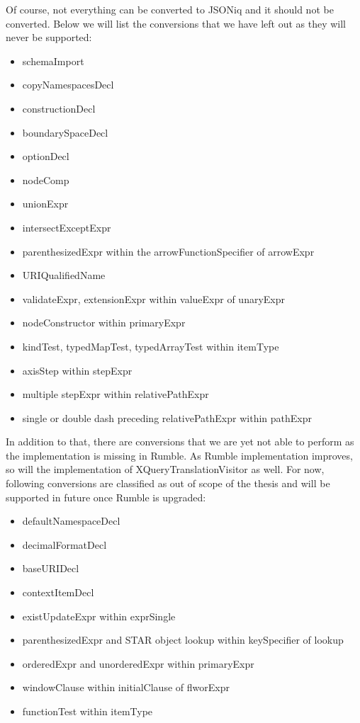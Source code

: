 Of course, not everything can be converted to JSONiq and it should not be converted. Below we will list the conversions that we have left out as they will never be supported:
\begin{itemize}
	\item schemaImport
	\item copyNamespacesDecl
	\item constructionDecl
	\item boundarySpaceDecl
	\item optionDecl
	\item nodeComp
	\item unionExpr
	\item intersectExceptExpr
	\item parenthesizedExpr within the arrowFunctionSpecifier of arrowExpr
	\item URIQualifiedName
	\item validateExpr, extensionExpr within valueExpr of unaryExpr
	\item nodeConstructor within primaryExpr
	\item kindTest, typedMapTest, typedArrayTest within itemType
	\item axisStep within stepExpr
	\item multiple stepExpr within relativePathExpr
	\item single or double dash preceding relativePathExpr within pathExpr
\end{itemize}

In addition to that, there are conversions that we are yet not able to perform as the implementation is missing in Rumble. As Rumble implementation improves, so will the implementation of XQueryTranslationVisitor as well. For now, following conversions are classified as out of scope of the thesis and will be supported in future once Rumble is upgraded:
\begin{itemize}
	\item defaultNamespaceDecl
	\item decimalFormatDecl
	\item baseURIDecl
	\item contextItemDecl
	\item existUpdateExpr within exprSingle
	\item parenthesizedExpr and STAR object lookup within keySpecifier of lookup
	\item orderedExpr and unorderedExpr within primaryExpr
	\item windowClause within initialClause of flworExpr
	\item functionTest within itemType
\end{itemize}

